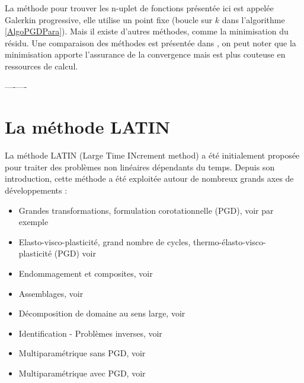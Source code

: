 \documentclass[12pt,a4paper]{report}
\begin{document}

La méthode pour trouver les n-uplet de fonctions présentée ici est appelée Galerkin progressive, elle utilise un point fixe (boucle sur $k$ dans 
l'algorithme \ref{AlgoPGDPara}). Mais il existe d'autres méthodes, comme la minimisation du résidu. Une comparaison des méthodes est présentée dans \cite{nouy2010priori}, on peut noter que la minimisation apporte l'assurance de la convergence mais est plus couteuse en ressources de calcul.

----\cite{boucinha2013space}----
\FloatBarrier

\section{La méthode LATIN}

La méthode LATIN (Large Time INcrement method) \cite{Lad85,Lad99} a été initialement proposée pour traiter des problèmes non linéaires dépendants  du temps. Depuis son introduction, cette méthode a été exploitée autour de nombreux grands axes de développements :\\
\begin{itemize}

\item Grandes transformations, formulation corotationnelle (PGD),
voir par exemple \cite{Boucard1997}

\item Elasto-visco-plasticité, grand nombre de cycles, thermo-élasto-visco-\\plasticité (PGD)
voir \cite{Cognard1999,pelle2000efficient}

\item Endommagement et composites,
voir \cite{Allix1992,Guinard2002,Saavedra-Redlich2012b}

\item Assemblages,
voir \cite{Lemoussu2000b,Champaney1996b}

\item Décomposition de domaine au sens large,
voir \cite{Loiseau2001,Ladeveze2002,Guidault2007,Violeau2006,Lad10}

\item Identification - Problèmes inverses,
voir \cite{Allix2002,Nguyen2008}

\item Multiparamétrique sans PGD,
voir \cite{Boucard03}

\item Multiparamétrique avec PGD,
voir \cite{Relun13}

\end{itemize}
  
\end{document}
